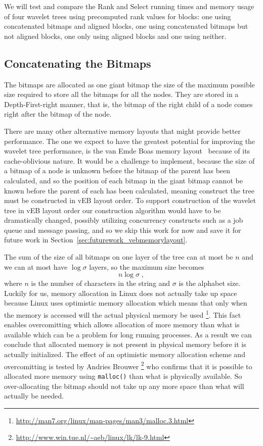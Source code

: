 We will test and compare the Rank and Select running times and memory usage of four wavelet trees using precomputed rank values for blocks: one using concatenated bitmaps and aligned blocks, one using concatenated bitmaps but not aligned blocks, one only using aligned blocks and one using neither.





\subsection{Concatenating the Bitmaps}
The bitmaps are allocated as one giant bitmap the size of the maximum possible size required to store all the bitmaps for all the nodes.
They are stored in a Depth-First-right manner, that is, the bitmap of the right child of a node comes right after the bitmap of the node.

There are many other alternative memory layouts that might provide better performance.
The one we expect to have the greatest potential for improving the wavelet tree performance, is the van Emde Boas memory layout~ because of its cache-oblivious nature.
It would be a challenge to implement, because the size of a bitmap of a node is unknown before the bitmap of the parent has been calculated, and so the position of each bitmap in the giant bitmap cannot be known before the parent of each has been calculated, meaning construct the tree must be constructed in vEB layout order.
To support construction of the wavelet tree in vEB layout order our construction algorithm would have to be dramatically changed, possibly utilizing concurrency constructs such as a job queue and message passing, and so we skip this work for now and save it for future work in Section~\ref{sec:futurework_vebmemorylayout}.

The sum of the size of all bitmaps on one layer of the tree can at most be $n$ and we can at most have $\log \sigma$ layers, so the maximum size becomes
\[n \log \sigma\;,\]
where $n$ is the number of characters in the string and $\sigma$ is the alphabet size.
Luckily for us, memory allocation in Linux does not actually take up space because Linux uses optimistic memory allocation which means that only when the memory is accessed will the actual physical memory be used \footnote{\url{http://man7.org/linux/man-pages/man3/malloc.3.html}}.
This fact enables overcomitting which allows allocation of more memory than what is available which can be a problem for long running processes.
As a result we can conclude that allocated memory is not present in physical memory before it is actually initialized.
The effect of an optimistic memory allocation scheme and overcomitting is tested by Andries Brouwer \footnote{\url{http://www.win.tue.nl/~aeb/linux/lk/lk-9.html}} who confirms that it is possible to allocated more memory using \texttt{malloc()} than what is physically available.
So over-allocating the bitmap should not take up any more space than what will actually be needed.

